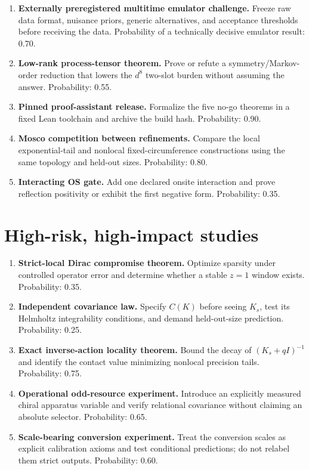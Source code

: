 \documentclass[11pt,a4paper,openany]{report}
\begin{document}
\begin{enumerate}
\item 
\textbf{Externally preregistered multitime emulator challenge.} Freeze raw data format, nuisance priors, generic alternatives, and acceptance thresholds before receiving the data. Probability of a technically decisive emulator result: 0.70.

\item 
\textbf{Low-rank process-tensor theorem.} Prove or refute a symmetry/\allowbreak{}Markov-order reduction that lowers the \(d^8\) two-slot burden without assuming the answer. Probability: 0.55.

\item 
\textbf{Pinned proof-assistant release.} Formalize the five no-go theorems in a fixed Lean toolchain and archive the build hash. Probability: 0.90.

\item 
\textbf{Mosco competition between refinements.} Compare the local exponential-tail and nonlocal fixed-circumference constructions using the same topology and held-out sizes. Probability: 0.80.

\item 
\textbf{Interacting OS gate.} Add one declared onsite interaction and prove reflection positivity or exhibit the first negative form. Probability: 0.35.

\end{enumerate}

\section{High-risk, high-impact studies}

\begin{enumerate}
\item 
\textbf{Strict-local Dirac compromise theorem.} Optimize sparsity under controlled operator error and determine whether a stable \(z=1\) window exists. Probability: 0.35.

\item 
\textbf{Independent covariance law.} Specify \(C(K)\) before seeing \(K_s\), test its Helmholtz integrability conditions, and demand held-out-size prediction. Probability: 0.25.

\item 
\textbf{Exact inverse-action locality theorem.} Bound the decay of \((K_s+qI)^{-1}\) and identify the contact value minimizing nonlocal precision tails. Probability: 0.75.

\item 
\textbf{Operational odd-resource experiment.} Introduce an explicitly measured chiral apparatus variable and verify relational covariance without claiming an absolute selector. Probability: 0.65.

\item 
\textbf{Scale-bearing conversion experiment.} Treat the conversion scales as explicit calibration axioms and test conditional predictions; do not relabel them strict outputs. Probability: 0.60.

\end{enumerate}
\end{document}
